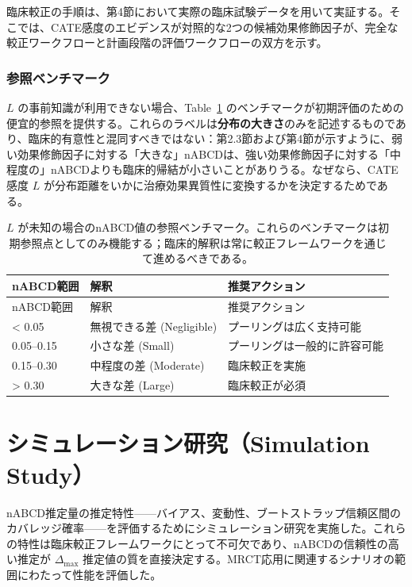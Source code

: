 \documentclass[
  a4paper,
  11pt]{ltjsarticle}
\begin{document}
臨床較正の手順は、第4節において実際の臨床試験データを用いて実証する。そこでは、CATE感度のエビデンスが対照的な2つの候補効果修飾因子が、完全な較正ワークフローと計画段階の評価ワークフローの双方を示す。

\subsubsection{参照ベンチマーク}\label{ux53c2ux7167ux30d9ux30f3ux30c1ux30deux30fcux30af}

\(L\) の事前知識が利用できない場合、Table~\ref{tbl-benchmarks}
のベンチマークが初期評価のための便宜的参照を提供する。これらのラベルは\textbf{分布の大きさ}のみを記述するものであり、臨床的有意性と混同すべきではない：第2.3節および第4節が示すように、弱い効果修飾因子に対する「大きな」nABCDは、強い効果修飾因子に対する「中程度の」nABCDよりも臨床的帰結が小さいことがありうる。なぜなら、CATE感度
\(L\) が分布距離をいかに治療効果異質性に変換するかを決定するためである。

\begin{longtable}[]{@{}lll@{}}
\caption{\(L\)
が未知の場合のnABCD値の参照ベンチマーク。これらのベンチマークは初期参照点としてのみ機能する；臨床的解釈は常に較正フレームワークを通じて進めるべきである。}\label{tbl-benchmarks}\tabularnewline
\toprule\noalign{}
nABCD範囲 & 解釈 & 推奨アクション \\
\midrule\noalign{}
\endfirsthead
\toprule\noalign{}
nABCD範囲 & 解釈 & 推奨アクション \\
\midrule\noalign{}
\endhead
\bottomrule\noalign{}
\endlastfoot
\textless{} 0.05 & 無視できる差 (Negligible) &
プーリングは広く支持可能 \\
0.05--0.15 & 小さな差 (Small) & プーリングは一般的に許容可能 \\
0.15--0.30 & 中程度の差 (Moderate) & 臨床較正を実施 \\
\textgreater{} 0.30 & 大きな差 (Large) & 臨床較正が必須 \\
\end{longtable}

\section{シミュレーション研究（Simulation
Study）}\label{ux30b7ux30dfux30e5ux30ecux30fcux30b7ux30e7ux30f3ux7814ux7a76simulation-study}

nABCD推定量の推定特性------バイアス、変動性、ブートストラップ信頼区間のカバレッジ確率------を評価するためにシミュレーション研究を実施した。これらの特性は臨床較正フレームワークにとって不可欠であり、nABCDの信頼性の高い推定が
\(\Delta_{\max}\)
推定値の質を直接決定する。MRCT応用に関連するシナリオの範囲にわたって性能を評価した。
\end{document}
